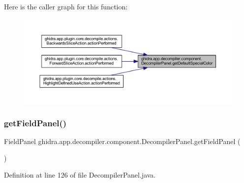Here is the caller graph for this function\+:
\nopagebreak
\begin{figure}[H]
\begin{center}
\leavevmode
\includegraphics[width=350pt]{classghidra_1_1app_1_1decompiler_1_1component_1_1_decompiler_panel_a28efeaf147c13c36846a05030f8e2532_icgraph}
\end{center}
\end{figure}
\mbox{\label{classghidra_1_1app_1_1decompiler_1_1component_1_1_decompiler_panel_aa1b8e95842468b7e57d59c1bd8a1be58}} 
\subsubsection{\texorpdfstring{getFieldPanel()}{getFieldPanel()}}
{\footnotesize\ttfamily Field\+Panel ghidra.\+app.\+decompiler.\+component.\+Decompiler\+Panel.\+get\+Field\+Panel (\begin{DoxyParamCaption}{ }\end{DoxyParamCaption})\hspace{0.3cm}{\ttfamily [inline]}}



Definition at line 126 of file Decompiler\+Panel.\+java.

